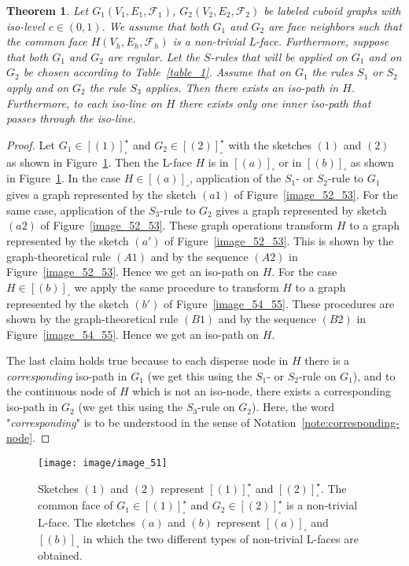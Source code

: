 \documentclass[a4paper,11pt]{article}
\newtheorem{theorem}{Theorem}[section]
\begin{document}
\begin{theorem}\label{thm:class-4}
Let $G_1(V_1,E_1,\mathcal{F}_1)$, $G_2(V_2,E_2,\mathcal{F}_2)$ be labeled cuboid graphs with iso-level
$c\in (0,1)$. We assume that both $G_1$ and $G_2$ are face neighbors such that the common face
$H(V_h,E_h,\mathcal{F}_h)$ is a non-trivial L-face. Furthermore, suppose that both $G_1$ and $G_2$ are
regular. Let the $S$-rules that will be applied on $G_1$ and on $G_2$ be chosen according to
Table~\ref{table_1}. Assume that on $G_1$ the rules $S_1$ or $S_2$ apply and on $G_2$ the rule $S_3$
applies. Then there exists an iso-path in $H$. Furthermore, to each iso-line on $H$ there exists only one
inner iso-path that passes through the iso-line.
\end{theorem}
\begin{proof} Let $G_1\in [(1)]_{\square}^{\star}$ and $G_2\in [(2)]_{\square}^{\star}$ with
the sketches $(1)$ and $(2)$ as shown in Figure~\ref{image_51}. Then the L-face $H$ is
in $[(a)]_{\square}$ or in $[(b)]_{\square}$ as shown in Figure~\ref{image_51}. In the case
$H\in [(a)]_{\square}$, application of the $S_1$- or $S_2$-rule to $G_1$ gives a graph represented
by the sketch $(a1)$ of Figure~\ref{image_52_53}. For the same case, application of the $S_3$-rule
to $G_2$ gives a graph represented by sketch $(a2)$ of Figure~\ref{image_52_53}. These graph
operations transform $H$ to a graph represented by the sketch $(a')$ of Figure~\ref{image_52_53}.
This is shown by the graph-theoretical rule $(A1)$ and by the sequence $(A2)$ in Figure~\ref{image_52_53}.
Hence we get an iso-path on $H$. For the case $H\in [(b)]_{\square}$ we apply the same procedure to
transform $H$ to a graph represented by the sketch $(b')$ of Figure~\ref{image_54_55}. These procedures
are shown by the graph-theoretical rule $(B1)$ and by the sequence $(B2)$ in Figure~\ref{image_54_55}.
Hence we get an iso-path on $H$.

The last claim holds true because to each disperse node in $H$ there is a {\it corresponding} iso-path
in $G_1$ (we get this using the $S_1$- or $S_2$-rule on $G_1$), and to the continuous node of $H$ which
is not an iso-node, there exists a corresponding iso-path in $G_2$ (we get this using the $S_3$-rule
on $G_2$). Here, the word "{\it corresponding}" is to be understood in the sense of
Notation~\ref{note:corresponding-node}.
\end{proof}
\begin{figure}[!ht]
\texttt{[image: image/image\_51]}
\caption{Sketches $(1)$ and $(2)$ represent $[(1)]_{\square}^{\star}$ and $[(2)]_{\square}^{\star}$.
The common face of $G_1\in [(1)]_{\square}^{\star}$ and $G_2\in [(2)]_{\square}^{\star}$ is a non-trivial
L-face. The sketches $(a)$ and $(b)$ represent $[(a)]_{\square}$ and $[(b)]_{\square}$ in which the two
different types of non-trivial L-faces are obtained.}
\label{image_51}
\end{figure}
\end{document}
